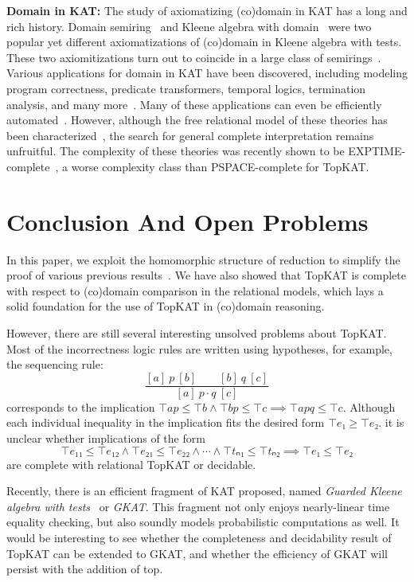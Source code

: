 \textbf{Domain in KAT:}
The study of axiomatizing (co)domain in KAT has a long and rich history. 
Domain semiring~\cite{Desharnais_Struth_2011} 
and Kleene algebra with domain~\cite{Desharnais_Möller_Struth_2006}
were two popular yet different axiomatizations of (co)domain in Kleene algebra with tests.
These two axiomitizations turn out to coincide in a large class of semirings~\cite{Fahrenberg_Johansen_Struth_Ziemiánski_2021}.
Various applications for domain in KAT have been discovered, including modeling
program correctness, predicate transformers, temporal logics, 
termination analysis, and many more~\cite{Desharnais_Möller_Struth_2004}.
Many of these applications can even be efficiently automated~\cite{hofner_AutomatedReasoningKleene_2007}.
However, although the free relational model of these theories has been characterized~\cite{mclean_FreeKleeneAlgebras_2020},
the search for general complete interpretation remains unfruitful.
The complexity of these theories was recently shown to be EXPTIME-complete~\cite{Sedlár_2023},
a worse complexity class than PSPACE-complete for TopKAT.



\section{Conclusion And Open Problems}

In this paper, we exploit the homomorphic structure of reduction
to simplify the proof of various previous results~\cite{Zhang_de_Amorim_Gaboardi_2022}.
We have also showed that TopKAT is complete with respect to (co)domain comparison
in the relational models,
which lays a solid foundation for the use of TopKAT in (co)domain reasoning.

However, there are still several interesting unsolved problems about TopKAT.
Most of the incorrectness logic rules are written using hypotheses,
for example, the sequencing rule:
\[
    \frac{[a]~p~[b] \qquad [b]~q~[c]}{[a]~p ⋅ q~[c]}
\]
corresponds to the implication \(⊤ a p ≤ ⊤ b ∧ ⊤ b p ≤ ⊤ c ⟹ ⊤ a p q ≤ ⊤ c\).
Although each individual inequality in the implication fits the desired form \(⊤ e₁ ≥ ⊤ e₂\).
it is unclear whether implications of the form
\[⊤ e₁₁ ≤ ⊤ e₁₂ ∧ ⊤ e₂₁ ≤ ⊤ e₂₂ ∧ ⋯ ∧ ⊤ tₙ₁ ≤ ⊤ tₙ₂ ⟹ ⊤ e₁ ≤ ⊤ e₂\]
are complete with relational TopKAT or decidable.

Recently, there is an efficient fragment of KAT proposed, named 
\emph{Guarded Kleene algebra with tests}~\cite{Smolka_Foster_Hsu_Kappé_Kozen_Silva_2020}
or \emph{GKAT}.
This fragment not only enjoys nearly-linear time equality checking,
but also soundly models probabilistic computations as well. 
It would be interesting to see whether the completeness and decidability result of TopKAT
can be extended to GKAT, and whether the efficiency of GKAT will persist with the addition of top.

